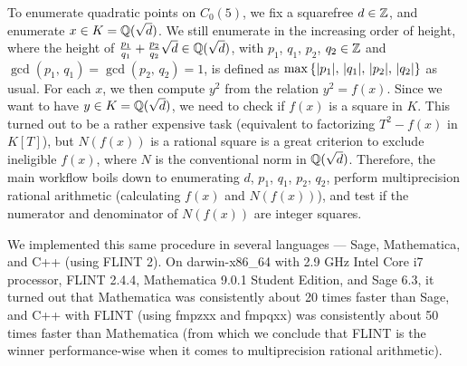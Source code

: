 To enumerate quadratic points on $C_0(5)$, we fix a squarefree $d \in
\mathbb{Z}$, and enumerate $x \in K = \mathbb{Q}(\sqrt{d})$. We still enumerate in the
increasing order of height, where the height of $\frac{p_1}{q_1} +
\frac{p_2}{q_2} \sqrt{d} \in \mathbb{Q}(\sqrt{d})$, with $p_1$, $q_1$, $p_2$,
$q_2 \in \mathbb{Z}$ and $\gcd(p_1,\, q_1) = \gcd(p_2,\, q_2) = 1$, is defined
as $\max\left\{|p_1|,\, |q_1|,\, |p_2|,\, |q_2|\right\}$ as usual. For each
$x$, we then compute $y^2$ from the relation $y^2 = f(x)$. Since we
want to have $y \in K = \mathbb{Q}(\sqrt{d})$, we need to check if $f(x)$ is a
square in $K$. This turned out to be a rather expensive task
(equivalent to factorizing $T^2 - f(x)$ in $K[T]$), but $N(f(x))$ is a
rational square is a great criterion to exclude ineligible $f(x)$,
where $N$ is the conventional norm in $\mathbb{Q}(\sqrt{d})$. Therefore, the
main workflow boils down to enumerating $d$, $p_1$, $q_1$, $p_2$,
$q_2$, perform multiprecision rational arithmetic (calculating $f(x)$
and $N(f(x))$), and test if the numerator and denominator of $N(f(x))$
are integer squares.

We implemented this same procedure in several languages --- Sage,
Mathematica, and C++ (using FLINT 2). On darwin-x86\_64 with 2.9 GHz
Intel Core i7 processor, FLINT 2.4.4, Mathematica 9.0.1 Student
Edition, and Sage 6.3, it turned out that Mathematica was consistently
about 20 times faster than Sage, and C++ with FLINT (using fmpzxx and
fmpqxx) was consistently about 50 times faster than Mathematica (from
which we conclude that FLINT is the winner performance-wise when it
comes to multiprecision rational arithmetic).

